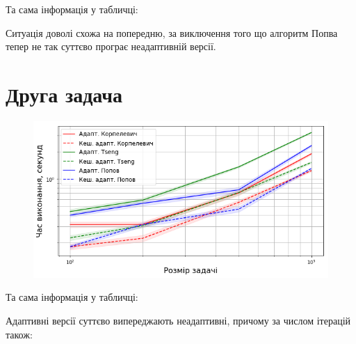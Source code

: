 Та сама інформація у табличці:





Ситуація доволі схожа на попередню, за виключення того що алгоритм Попва тепер не так суттєво програє неадаптивній версії.

\section{Друга задача}

\begin{figure}[H]
    \centering
    \includegraphics[width=.75\textwidth]{img/2/adapt/time.png}
\end{figure}

Та сама інформація у табличці:



Адаптивні версії суттєво випереджають неадаптивні, причому за числом ітерацій також:


